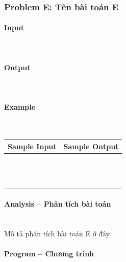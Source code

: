 \documentclass{article}
\begin{document}
\subsubsection{Problem E: Tên bài toán E}

\paragraph{Input} \mbox{} \\



\paragraph{Output}\mbox{} \\


\paragraph{Example}\mbox{} \\

\begin{table}[h]
    \centering
    \begin{tabular}{|l|r|}
        \hline
        \textbf{Sample Input} & \textbf{Sample Output} \\
        \hline
		&  \\ 
		&  \\ 
		&  \\ 
		&  \\ 
		&  \\
		&  \\ 
		&  \\ 
		&  \\ 
		&  \\ 
		&  \\ 
		&  \\ 
		&  \\
		&  \\ \hline
    \end{tabular}
\end{table}

\paragraph{Analysis -- Phân tích bài toán} \mbox{} \\

Mô tả phân tích bài toán E ở đây.

\paragraph{Program -- Chương trình} \mbox{} \\
\end{document}
